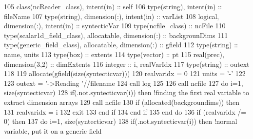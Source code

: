 \begin{DoxyCode}
105     \textcolor{keywordtype}{class}(ncReader\_class), \textcolor{keywordtype}{intent(in)} :: self
106     \textcolor{keywordtype}{type}(string), \textcolor{keywordtype}{intent(in)} :: fileName
107     \textcolor{keywordtype}{type}(string), \textcolor{keywordtype}{dimension(:)}, \textcolor{keywordtype}{intent(in)} :: varList
108     \textcolor{keywordtype}{logical}, \textcolor{keywordtype}{dimension(:)}, \textcolor{keywordtype}{intent(in)} :: syntecticVar    
109     \textcolor{keywordtype}{type}(ncfile\_class) :: ncFile
110     \textcolor{keywordtype}{type}(scalar1d\_field\_class), \textcolor{keywordtype}{allocatable}, \textcolor{keywordtype}{dimension(:)} :: backgrounDims
111     \textcolor{keywordtype}{type}(generic\_field\_class), \textcolor{keywordtype}{allocatable}, \textcolor{keywordtype}{dimension(:)} :: gfield
112     \textcolor{keywordtype}{type}(string) :: name, units
113     \textcolor{keywordtype}{type}(box) :: extents
114     \textcolor{keywordtype}{type}(vector) :: pt
115     \textcolor{keywordtype}{real(prec)}, \textcolor{keywordtype}{dimension(3,2)} :: dimExtents
116     \textcolor{keywordtype}{integer} :: i, realVarIdx
117     \textcolor{keywordtype}{type}(string) :: outext
118 
119     \textcolor{keyword}{allocate}(gfield(\textcolor{keyword}{size}(syntecticvar)))
120     realvaridx = 0
121     units = \textcolor{stringliteral}{'-'}
122     
123     outext = \textcolor{stringliteral}{'->Reading '}//filename
124     \textcolor{keyword}{call }log%
125 
126     \textcolor{keyword}{call }ncfile%
127     \textcolor{keywordflow}{do} i=1, \textcolor{keyword}{size}(syntecticvar)
128         \textcolor{keywordflow}{if}(.not.syntecticvar(i)) \textcolor{keywordflow}{then} \textcolor{comment}{!finding the first real variable to extract dimension arrays}
129             \textcolor{keyword}{call }ncfile%
130             \textcolor{keywordflow}{if} (\textcolor{keyword}{allocated}(backgroundims)) \textcolor{keywordflow}{then}
131                 realvaridx = i
132                 \textcolor{keywordflow}{exit}
133 \textcolor{keywordflow}{            end if}            
134 \textcolor{keywordflow}{        end if}
135 \textcolor{keywordflow}{    end do}
136     \textcolor{keywordflow}{if} (realvaridx /= 0) \textcolor{keywordflow}{then}
137         \textcolor{keywordflow}{do} i=1, \textcolor{keyword}{size}(syntecticvar)
138             \textcolor{keywordflow}{if}(.not.syntecticvar(i)) \textcolor{keywordflow}{then} \textcolor{comment}{!normal variable, put it on a generic field}

\end{DoxyCode}
